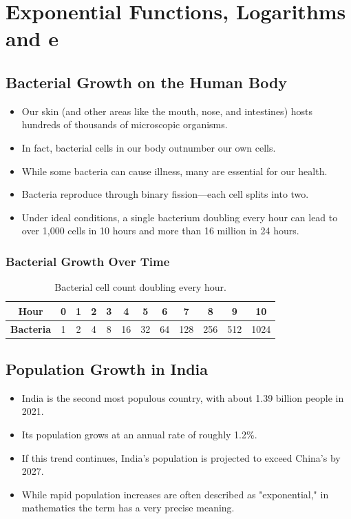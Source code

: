 \chapter{Exponential Functions, Logarithms and e}
\author{Nithin}

\section{Bacterial Growth on the Human Body}
\begin{itemize}
  \item Our skin (and other areas like the mouth, nose, and intestines) hosts hundreds of thousands of microscopic organisms.
  \item In fact, bacterial cells in our body outnumber our own cells.
  \item While some bacteria can cause illness, many are essential for our health.
  \item Bacteria reproduce through binary fission—each cell splits into two.
  \item Under ideal conditions, a single bacterium doubling every hour can lead to over 1,000 cells in 10 hours and more than 16 million in 24 hours.
\end{itemize}

\subsection{Bacterial Growth Over Time}
\begin{table}[ht]
  \centering
  \begin{tabular}{c|ccccccccccc}
    \textbf{Hour} & 0 & 1 & 2 & 3 & 4 & 5 & 6 & 7 & 8 & 9 & 10 \\ \hline
    \textbf{Bacteria} & 1 & 2 & 4 & 8 & 16 & 32 & 64 & 128 & 256 & 512 & 1024 \\
  \end{tabular}
  \caption{Bacterial cell count doubling every hour.}
\end{table}

\section{Population Growth in India}
\begin{itemize}
  \item India is the second most populous country, with about 1.39 billion people in 2021.
  \item Its population grows at an annual rate of roughly 1.2\%.
  \item If this trend continues, India's population is projected to exceed China’s by 2027.
  \item While rapid population increases are often described as "exponential," in mathematics the term has a very precise meaning.
\end{itemize}

